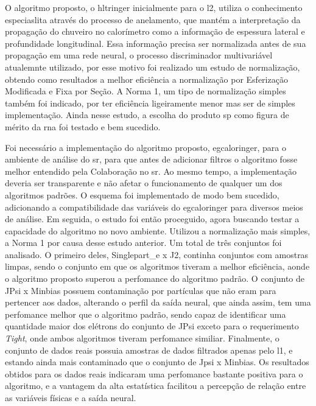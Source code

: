 O algoritmo proposto, o \gls{hltringer} inicialmente para o \gls{l2}, utiliza o
conhecimento especiaslita através do processo de anelamento, que mantém a interpretação da propagação do
chuveiro no calorímetro como a informação de espessura lateral e profundidade
longitudinal. Essa informação precisa ser normalizada antes de sua propagação em
uma rede neural, o processo discriminador multivariável atualemnte utilizado,
por esse motivo foi realizado um estudo de normalização, obtendo como resultados
a melhor eficiência a normalização por Esferização Modificada e Fixa por Seção.
A Norma 1, um tipo de normalização simples também foi indicado, por ter
eficiência ligeiramente menor mas ser de simples implementação. Ainda nesse
estudo, a escolha do produto \gls{sp} como figura de mérito da \gls{rna} foi
testado e bem sucedido.

Foi necessário a implementação do algoritmo proposto, \gls{egcaloringer}, para o ambiente de análise
do \gls{sr}, para que antes de adicionar filtros o algoritmo fosse melhor
entendido pela Colaboração no \gls{sr}. Ao mesmo tempo, a implementação deveria ser transparente e não
afetar o funcionamento de qualquer um dos algoritmos padrões. O esquema foi
implementado de modo bem sucedido, adicionando a compatibilidade das variáveis
do \gls{egcaloringer} para diversos meios de análise. Em seguida, o estudo foi então
proceguido, agora buscando testar a capacidade do algoritmo no novo ambiente.
Utilizou a normalização mais simples, a Norma 1 por causa desse estudo anterior.
Um total de três conjuntos foi analisado. O primeiro deles, Singlepart\_e x J2,
continha conjuntos com amostras limpas, sendo o conjunto em que os algoritmos
tiveram a melhor eficiência, aonde o algoritmo proposto superou a perfomance do
algoritmo padrão. O conjunto de JPsi x Minbias possuem contaminação por
partículas que não eram para pertencer aos dados, alterando o perfil da saída
neural, que ainda assim, tem uma perfomance melhor que o algoritmo padrão, sendo
capaz de identificar uma quantidade maior dos elétrons do conjunto de JPsi
exceto para o requerimento \emph{Tight}, onde ambos algoritmos tiveram
perfomance similiar. Finalmente, o conjunto de dados reais possuia amostras de
dados filtrados apenas pelo \gls{l1}, e estando ainda mais contaminado que o
conjunto de Jpsi x Minbias. Os resultados obtidos para os dados reais indicaram
uma perfomance bastante positiva para o algoritmo, e a vantagem da alta
estatística facilitou a percepção de relação entre as variáveis físicas e a saída
neural.

